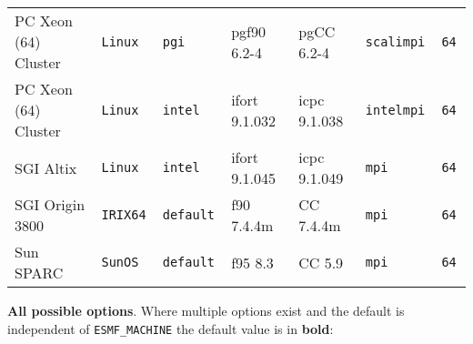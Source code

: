 \begin{tabular}{lllllll}
PC Xeon (64) Cluster &\tt Linux  &\tt pgi    & pgf90 \footnotesize 6.2-4    & pgCC \footnotesize 6.2-4    &\tt scalimpi  &\tt 64 \\
PC Xeon (64) Cluster &\tt Linux  &\tt intel  & ifort \footnotesize 9.1.032  & icpc \footnotesize 9.1.038  &\tt intelmpi  &\tt 64 \\
SGI Altix      &\tt Linux  &\tt intel   & ifort \footnotesize 9.1.045 & icpc \footnotesize 9.1.049 &\tt mpi   &\tt 64 \\
SGI Origin 3800&\tt IRIX64 &\tt default & f90 \footnotesize 7.4.4m  & CC \footnotesize 7.4.4m   &\tt mpi      &\tt 64 \\
Sun SPARC      &\tt SunOS  &\tt default & f95 \footnotesize 8.3     & CC \footnotesize 5.9      &\tt mpi      &\tt 64
\end{tabular}

\vspace{1ex}

{\bf All possible options}. Where multiple options exist 
and the default is independent of {\tt ESMF\_MACHINE} the default value is in {\bf bold}:

\vspace{1ex}


